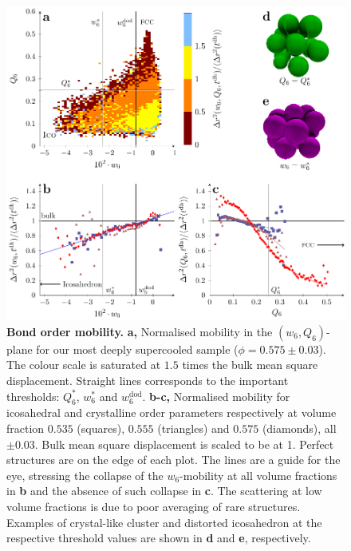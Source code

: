 \clearpage

\begin{figure}
\begin{center}
\includegraphics{fig_msd_Q6_w6.pdf}
\end{center}
\caption{\textbf{Bond order mobility.} {\bf a,} Normalised mobility in the $(w_6, Q_6)$-plane for our most deeply supercooled sample ($\phi = 0.575 \pm 0.03$). The colour scale is saturated at $1.5$ times the bulk mean square displacement. Straight lines corresponds to the important thresholds: $Q_6^*$, $w_6^*$ and $w_6^\text{dod}$. {\bf b-c,} Normalised mobility for icosahedral and crystalline order parameters respectively at volume fraction $0.535$ (squares), $0.555$ (triangles) and $0.575$ (diamonds), all $\pm 0.03$. Bulk mean square displacement is scaled to be at 1. Perfect structures are on the edge of each plot. The lines are a guide for the eye, stressing the collapse of the $w_6$-mobility at all volume fractions in {\bf b} and the absence of such collapse in {\bf c}. The scattering at low volume fractions is due to poor averaging of rare structures. Examples of crystal-like cluster and distorted icosahedron at the respective threshold values are shown in \textbf{d} and \textbf{e}, respectively.}
	\label{fig:msd_Q6_w6}
\end{figure}

\clearpage

